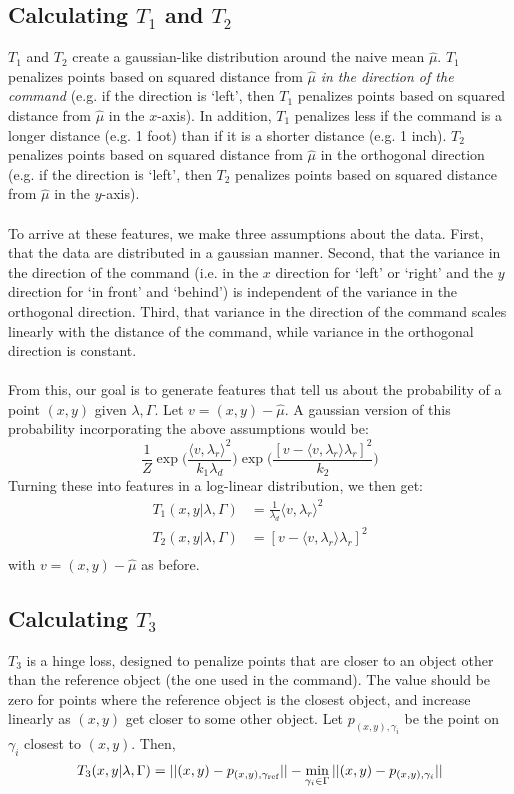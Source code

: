 \documentclass[12pt,letterpaper]{article}
\newcommand\refobj{\textmd{ref}}
\begin{document}
\subsection*{Calculating $T_1$ and $T_2$}
$T_1$ and $T_2$ create a gaussian-like distribution around the naive mean $\hat{\mu}$. $T_1$ penalizes points based on squared distance from $\hat{\mu}$ \emph{in the direction of the command} (e.g. if the direction is `left', then $T_1$ penalizes points based on squared distance from $\hat{\mu}$ in the $x$-axis). In addition, $T_1$ penalizes less if the command is a longer distance (e.g. 1 foot) than if it is a shorter distance (e.g. 1 inch). $T_2$ penalizes points based on squared distance from $\hat{\mu}$ in the orthogonal direction (e.g. if the direction is `left', then $T_2$ penalizes points based on squared distance from $\hat{\mu}$ in the $y$-axis). \\
\\
To arrive at these features, we make three assumptions about the data. First, that the data are distributed in a gaussian manner. Second, that the variance in the direction of the command (i.e. in the $x$ direction for `left' or `right' and the $y$ direction for `in front' and `behind') is independent of the variance in the orthogonal direction. Third, that variance in the direction of the command scales linearly with the distance of the command, while variance in the orthogonal direction is constant. \\
\\
From this, our goal is to generate features that tell us about the probability of a point $(x, y)$ given $\lambda, \Gamma$. Let $v = (x, y) - \hat{\mu}$. A gaussian version of this probability incorporating the above assumptions would be:
\[
\frac{1}{Z}\exp\bigg(\frac{\langle v, \lambda_r\rangle^2}{k_1 \lambda_d}\bigg)\exp\bigg(\frac{[v - \langle v, \lambda_r\rangle\lambda_r]^2}{k_2}\bigg)
\]
Turning these into features in a log-linear distribution, we then get:
\begin{equation*}
\begin{split}
T_1(x, y | \lambda, \Gamma) &= \frac{1}{\lambda_d} \langle v, \lambda_r \rangle^2 \\
T_2(x, y | \lambda, \Gamma) &= [v - \langle v, \lambda_r \rangle\lambda_r]^2 \\
\end{split}
\end{equation*}
with $v = (x, y) - \hat{\mu}$ as before.

\subsection*{Calculating $T_3$}
$T_3$ is a hinge loss, designed to penalize points that are closer to an object other than the reference object (the one used in the command). The value should be zero for points where the reference object is the closest object, and increase linearly as $(x, y)$ get closer to some other object. Let $p_{(x, y), \gamma_i}$ be the point on $\gamma_i$ closest to $(x, y)$. Then,
\[
T_3(x, y|\lambda, \Gamma) = ||(x, y) - p_{(x, y), \gamma_{\refobj}}|| - \min_{\gamma_i \in \Gamma} ||(x, y) - p_{(x, y), \gamma_i}||
\]
\end{document}
